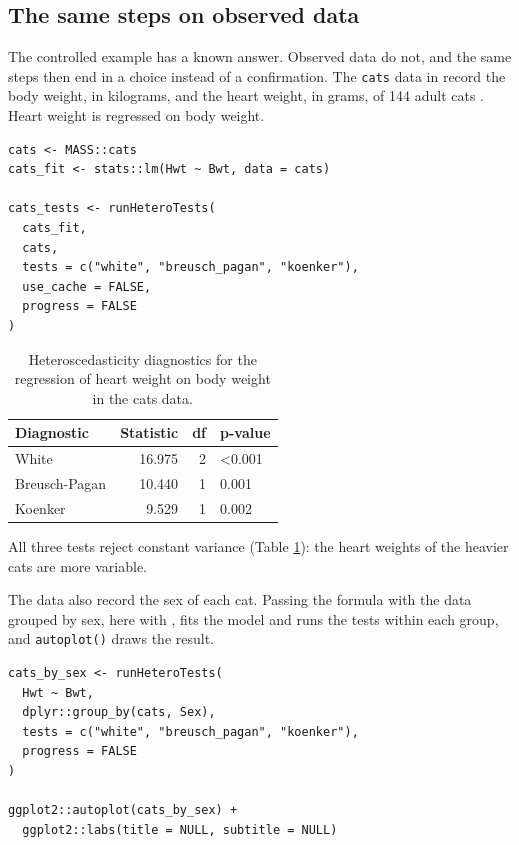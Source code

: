 \subsection{The same steps on observed data}\label{the-same-steps-on-observed-data}

The controlled example has a known answer. Observed data do not, and the same
steps then end in a choice instead of a confirmation. The \texttt{cats} data in
 \citep{venables2002modern} record the body weight, in kilograms, and
the heart weight, in grams, of 144 adult cats
\citep{fisher1947analysis}. Heart weight is regressed on body weight.

\begin{verbatim}
cats <- MASS::cats
cats_fit <- stats::lm(Hwt ~ Bwt, data = cats)

cats_tests <- runHeteroTests(
  cats_fit,
  cats,
  tests = c("white", "breusch_pagan", "koenker"),
  use_cache = FALSE,
  progress = FALSE
)
\end{verbatim}

\begin{table}

\caption{\label{tab:cats-table}Heteroscedasticity diagnostics for the regression of heart weight on body weight in the cats data.}
\centering
\begin{tabular}[t]{lrrl}
\toprule
Diagnostic & Statistic & df & p-value\\
\midrule
White & 16.975 & 2 & <0.001\\
Breusch-Pagan & 10.440 & 1 & 0.001\\
Koenker & 9.529 & 1 & 0.002\\
\bottomrule
\end{tabular}
\end{table}

All three tests reject constant variance (Table \ref{tab:cats-table}): the
heart weights of the heavier cats are more variable.

The data also record the sex of each cat. Passing the formula with the data
grouped by sex, here with , fits the model and runs the tests
within each group, and \texttt{autoplot()} draws the result.

\begin{verbatim}
cats_by_sex <- runHeteroTests(
  Hwt ~ Bwt,
  dplyr::group_by(cats, Sex),
  tests = c("white", "breusch_pagan", "koenker"),
  progress = FALSE
)

ggplot2::autoplot(cats_by_sex) +
  ggplot2::labs(title = NULL, subtitle = NULL)
\end{verbatim}

